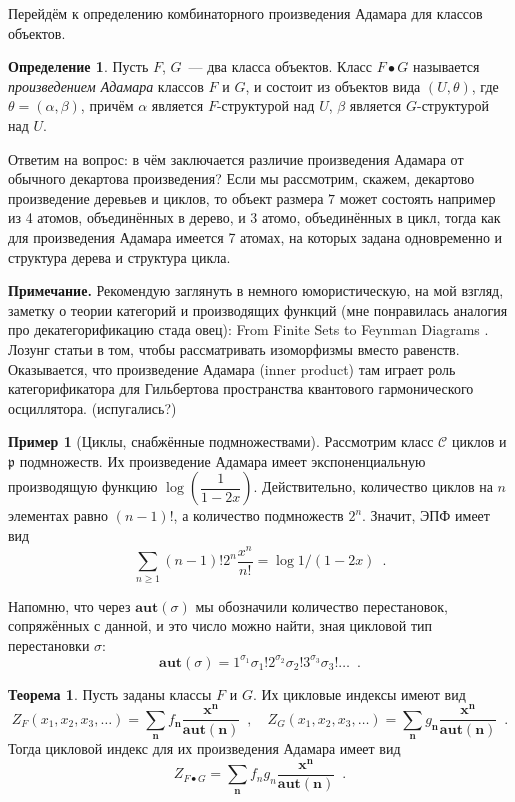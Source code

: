 \documentclass{article}
\def \vec {\boldsymbol}
\theoremstyle{definition}
\newtheorem{example}{Пример}
\newtheorem*{theorem}{Теорема}
\newtheorem*{definition}{Определение}
\begin{document}
Перейдём к определению комбинаторного произведения Адамара для классов объектов.
\begin{definition}
    Пусть \( F \), \( G\)~--- два класса объектов. Класс \( F \bullet G \)
называется \textit{произведением Адамара} классов \( F \) и \( G \), и состоит
из объектов вида \( (U, \theta) \), где \( \theta = (\alpha, \beta) \), причём
\(\alpha \) является \(F\)-структурой над \(U \), \(\beta\) является
\(G\)-структурой над \( U \).
\end{definition}
Ответим на вопрос: в чём заключается различие произведения Адамара от обычного
декартова произведения? Если мы рассмотрим, скажем, декартово произведение
деревьев и циклов, то объект размера \( 7 \) может состоять например из 4
атомов, объединённых в дерево, и 3 атомо, объединённых в цикл, тогда как для
произведения Адамара имеется 7 атомах, на которых задана одновременно и
структура дерева и структура цикла.

{\footnotesize
\textbf{Примечание.} Рекомендую заглянуть в немного юмористическую, на мой
взгляд, заметку о теории категорий и производящих функций
(мне понравилась аналогия про декатегорификацию стада овец): From Finite Sets to Feynman Diagrams
\cite{category_feynman}. Лозунг статьи в том, чтобы рассматривать изоморфизмы
вместо равенств. Оказывается, что произведение Адамара (inner product)
там играет роль категорификатора для Гильбертова пространства квантового
гармонического осциллятора. (испугались?)
}

\begin{example}[Циклы, снабжённые подмножествами]
Рассмотрим класс \( \mathcal C \) циклов и \( \mathfrak p \) подмножеств. Их
произведение Адамара имеет экспоненциальную производящую функцию  \( \log \left(
\dfrac{1}{1 - 2x} \right) \). Действительно, количество циклов на \( n \)
элементах равно \( (n-1)! \), а количество подмножеств \( 2^n \). Значит, ЭПФ
имеет вид
\[
    \sum_{n \geq 1} (n-1)! 2^n\dfrac{x^n}{n!} = \log 1/(1-2x) \enspace .
\]
\end{example}

Напомню, что через \( \mathbf{aut}(\sigma) \) мы обозначили количество
перестановок, сопряжённых с данной, и это число можно найти, зная цикловой тип
перестановки \( \sigma \):
\[
    \mathbf{aut}(\sigma) = 1^{\sigma_1} \sigma_1! 2^{\sigma_2} \sigma_2!
3^{\sigma_3} \sigma_3 ! \ldots \enspace .
\]

\begin{theorem}
    Пусть заданы классы \( F \) и \( G \). Их цикловые индексы имеют вид
\[
    Z_F(x_1, x_2, x_3, \ldots) = \sum_{\vec n} f_{\vec n} \dfrac{\vec x^{\vec
n}}{\mathbf{aut}(\vec n)} \enspace , \quad
    Z_G(x_1, x_2, x_3, \ldots) = \sum_{\vec n} g_{\vec n} \dfrac{\vec x^{\vec
n}}{\mathbf{aut}(\vec n)} \enspace .
\]
Тогда цикловой индекс для их произведения
Адамара имеет вид
\[
    Z_{F \bullet G} = \sum_{\vec n} f_n g_n \dfrac{\vec x^{\vec
n}}{\mathbf{aut}(\vec n)} \enspace . 
\] 
\end{theorem}
\end{document}
